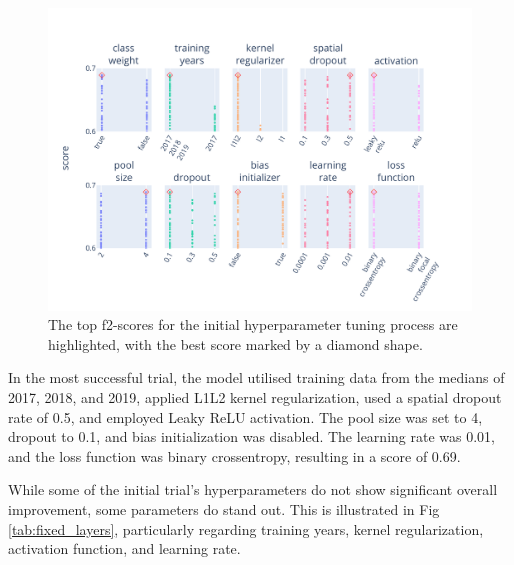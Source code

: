 \begin{figure}[ht]
    \centering
    \includegraphics[width=0.9\linewidth, trim={10pt 10pt 40pt 40pt}, clip]{figures/figures_tuner/fixed_layers.pdf}
    \caption{The top f2-scores for the initial hyperparameter tuning process are highlighted, with the best score marked by a diamond shape.}
    \label{fig:fixed_layers}
\end{figure}

In the most successful trial, the model utilised training data from the medians of 2017, 2018, and 2019, applied L1L2 kernel regularization, used a spatial dropout rate of 0.5, and employed Leaky ReLU activation. The pool size was set to 4, dropout to 0.1, and bias initialization was disabled. The learning rate was 0.01, and the loss function was binary crossentropy, resulting in a score of 0.69.

While some of the initial trial's hyperparameters do not show significant overall improvement, some parameters do stand out. This is illustrated in Fig\,\ref{tab:fixed_layers}, particularly regarding training years, kernel regularization, activation function, and learning rate.